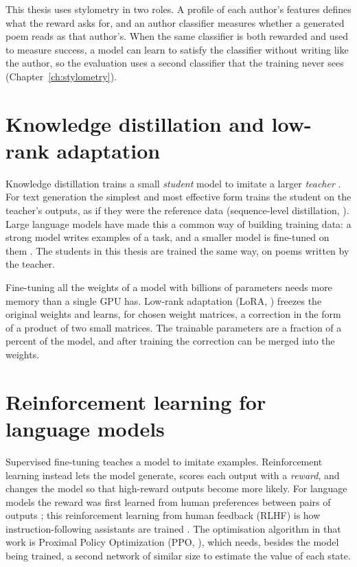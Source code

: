 This thesis uses stylometry in two roles. A profile of each author's
features defines what the reward asks for, and an author classifier
measures whether a generated poem reads as that author's. When the same
classifier is both rewarded and used to measure success, a model can learn
to satisfy the classifier without writing like the author, so the
evaluation uses a second classifier that the training never sees
(Chapter~\ref{ch:stylometry}).

\section{Knowledge distillation and low-rank adaptation}

Knowledge distillation trains a small \emph{student} model to imitate a
larger \emph{teacher} \citep{hinton2015distilling}. For text generation the
simplest and most effective form trains the student on the teacher's
outputs, as if they were the reference data (sequence-level distillation,
\citealp{kim2016seqkd}). Large language models have made this a common way
of building training data: a strong model writes examples of a task, and a
smaller model is fine-tuned on them \citep{wang2023selfinstruct}. The
students in this thesis are trained the same way, on poems written by the
teacher.

Fine-tuning all the weights of a model with billions of parameters needs
more memory than a single GPU has. Low-rank adaptation (LoRA,
\citealp{hu2022lora}) freezes the original weights and learns, for chosen
weight matrices, a correction in the form of a product of two small
matrices. The trainable parameters are a fraction of a percent of the
model, and after training the correction can be merged into the weights.

\section{Reinforcement learning for language models}

Supervised fine-tuning teaches a model to imitate examples. Reinforcement
learning instead lets the model generate, scores each output with a
\emph{reward}, and changes the model so that high-reward outputs become more
likely. For language models the reward was first learned from human
preferences between pairs of outputs \citep{christiano2017deep,
ziegler2019finetuning}; this reinforcement learning from human feedback
(RLHF) is how instruction-following assistants are trained
\citep{ouyang2022instructgpt}. The optimisation algorithm in that work is
Proximal Policy Optimization (PPO, \citealp{schulman2017ppo}), which needs,
besides the model being trained, a second network of similar size to
estimate the value of each state.

